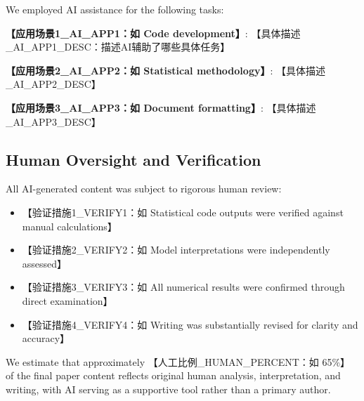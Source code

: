 \documentclass{mcmthesis}
\begin{document}
We employed AI assistance for the following tasks:

\textbf{【应用场景1_AI_APP1：如 Code development】}: 【具体描述_AI_APP1_DESC：描述AI辅助了哪些具体任务】

\textbf{【应用场景2_AI_APP2：如 Statistical methodology】}: 【具体描述_AI_APP2_DESC】

\textbf{【应用场景3_AI_APP3：如 Document formatting】}: 【具体描述_AI_APP3_DESC】

\subsection*{Human Oversight and Verification}

All AI-generated content was subject to rigorous human review:
\begin{itemize}
\item 【验证措施1_VERIFY1：如 Statistical code outputs were verified against manual calculations】
\item 【验证措施2_VERIFY2：如 Model interpretations were independently assessed】
\item 【验证措施3_VERIFY3：如 All numerical results were confirmed through direct examination】
\item 【验证措施4_VERIFY4：如 Writing was substantially revised for clarity and accuracy】
\end{itemize}

We estimate that approximately 【人工比例_HUMAN_PERCENT：如 65\%】 of the final paper content reflects original human analysis, interpretation, and writing, with AI serving as a supportive tool rather than a primary author.
\end{document}
